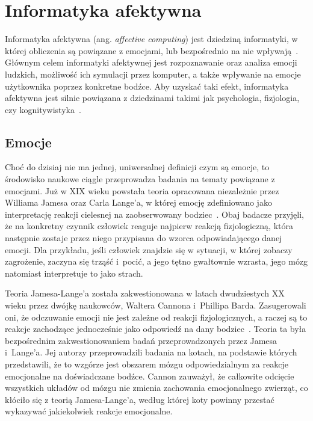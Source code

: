 \chapter{Informatyka afektywna}
\label{cha:affectiveComputing}

Informatyka afektywna (ang. \textit{affective computing}) jest dziedziną informatyki, w której obliczenia są powiązane z emocjami, lub bezpośrednio na nie wpływają~\cite{Picard:1997:AC:265013}. Głównym celem informatyki afektywnej jest rozpoznawanie oraz analiza emocji ludzkich, możliwość ich symulacji przez komputer, a także wpływanie na emocje użytkownika poprzez konkretne bodźce. Aby uzyskać taki efekt, informatyka afektywna jest silnie powiązana z dziedzinami takimi jak psychologia, fizjologia, czy kognitywistyka~\cite{affective_computing_review_tao_tieniu}.

\section{Emocje}
Choć do dzisiaj nie ma jednej, uniwersalnej definicji czym są emocje, to środowisko naukowe ciągle przeprowadza badania na tematy powiązane z emocjami. Już w XIX wieku powstała teoria opracowana niezależnie przez Williama Jamesa oraz Carla Lange'a, w której emocję zdefiniowano jako interpretację reakcji cielesnej na zaobserwowany bodziec~\cite{Coleman2011}. Obaj badacze przyjęli, że na konkretny czynnik człowiek reaguje najpierw reakcją fizjologiczną, która następnie zostaje przez niego przypisana do wzorca odpowiadającego danej emocji. Dla przykładu, jeśli człowiek znajdzie się w sytuacji, w której zobaczy zagrożenie, zaczyna się trząść i~pocić, a jego tętno gwałtownie wzrasta, jego mózg natomiast interpretuje to jako strach.

Teoria Jamesa-Lange'a została zakwestionowana w latach dwudziestych XX wieku przez dwójkę naukowców, Waltera Cannona i~Phillipa Barda. Zasugerowali oni, że odczuwanie emocji nie jest zależne od reakcji fizjologicznych, a raczej są to reakcje zachodzące jednocześnie jako odpowiedź na dany bodziec~\cite{cannon_1927}. Teoria ta była bezpośrednim zakwestionowaniem badań przeprowadzonych przez Jamesa i~Lange'a. Jej autorzy przeprowadzili badania na kotach, na podstawie których przedstawili, że to wzgórze jest obszarem mózgu odpowiedzialnym za reakcje emocjonalne na doświadczane bodźce. Cannon zauważył, że całkowite odcięcie wszystkich układów od mózgu nie zmienia zachowania emocjonalnego zwierząt, co kłóciło się z teorią Jamesa-Lange'a, według której koty powinny przestać wykazywać jakiekolwiek reakcje emocjonalne.

